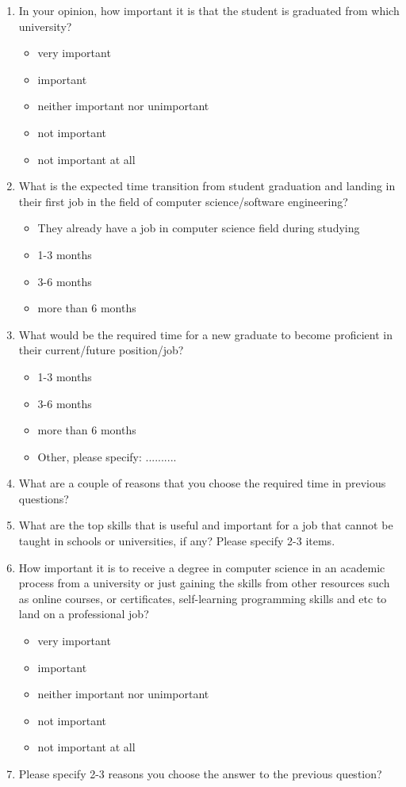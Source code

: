 \documentclass[12pt,a4paper,titlepage]{article}
\begin{document}
\begin{enumerate}
	\item In your opinion, how important it is that the student is graduated from which university?
	\begin{itemize}
		\item very important
		\item important
		\item neither important nor unimportant
		\item not important
		\item not important at all
	\end{itemize} 

	\item What is the expected time transition from student graduation and landing in their first job in the field of computer science/software engineering?
	\begin{itemize}
		\item They already have a job in computer science field during studying
		\item 1-3 months
		\item 3-6 months
		\item more than 6 months
	\end{itemize}

	\item What would be the required time for a new graduate to become proficient in their current/future position/job?
	\begin{itemize}
		\item 1-3 months
		\item 3-6 months
		\item more than 6 months
		\item Other, please specify: ..........
	\end{itemize}

	\item What are a couple of reasons that you choose the required time in previous questions?

	\item What are the top skills that is useful and important for a job that cannot be taught in schools or universities, if any? Please specify 2-3 items.

	\item How important it is to receive a degree in computer science in an academic process from a university or just gaining the skills from other resources such as online courses, or certificates, self-learning programming skills and etc to land on a professional job?
	\begin{itemize}
		\item very important
		\item important
		\item neither important nor unimportant
		\item not important
		\item not important at all
	\end{itemize} 

	\item Please specify 2-3 reasons you choose the answer to the previous question?

\end{enumerate}

{}

\end{document}
